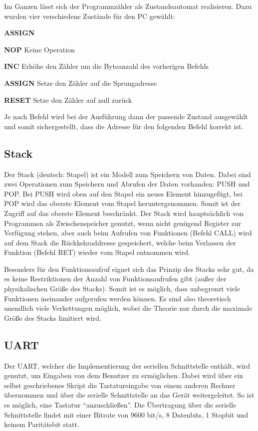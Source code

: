 Im Ganzen lässt sich der Programmzähler als Zustandsautomat realisieren. Dazu
wurden vier verschiedene Zustände für den \ac{PC} gewählt:

\begin{labeling}{\textbf{ASSIGN}}
\item[\textbf{NOP}]		Keine Operation
\item[\textbf{INC}]		Erhöhe den Zähler um die Byteanzahl des vorherigen Befehls
\item[\textbf{ASSIGN}]	Setze den Zähler auf die Sprungadresse
\item[\textbf{RESET}]	Setze den Zähler auf null zurück
\end{labeling}

Je nach Befehl wird bei der Ausführung dann der passende Zustand ausgewählt und
somit sichergestellt, dass die Adresse für den folgenden Befehl korrekt ist.
\subsection{Stack}
\label{s:stack}
Der Stack (deutsch: Stapel) ist ein Modell zum Speichern von Daten. Dabei sind
zwei Operationen zum Speichern und Abrufen der Daten vorhanden: PUSH und POP\@.
Bei PUSH wird oben auf den Stapel ein neues Element hinzugefügt, bei POP wird
das oberste Element vom Stapel heruntergenommen. Somit ist der Zugriff auf das
oberste Element beschränkt. Der Stack wird hauptsächlich von Programmen als
Zwischenspeicher genutzt, wenn nicht genügend Register zur Verfügung stehen,
aber auch beim Aufrufen von Funktionen (Befehl CALL) wird auf dem Stack die
Rückkehraddresse gespeichert, welche beim Verlassen der Funktion (Befehl RET)
wieder vom Stapel entnommen wird.

Besonders für den Funktionsaufruf eignet sich das Prinzip des Stacks sehr gut,
da es keine Restriktionen der Anzahl von Funktionsaufrufen gibt (außer der
physikalischen Größe des Stacks). Somit ist es möglich, dass unbegrenzt viele
Funktionen ineinander aufgerufen werden können. Es sind also theoretisch
unendlich viele Verkettungen möglich, wobei die Theorie nur durch die maximale
Größe des Stacks limitiert wird.

\subsection{UART}
\label{s:uart}
Der \ac{UART}, welcher die Implementierung der seriellen Schnittstelle enthält,
wird genutzt, um Eingaben von dem Benutzer zu ermöglichen. Dabei wird über ein
selbst geschriebenes Skript die Tastatureingabe von einem anderen Rechner
übernommen und über die serielle Schnittstelle an das Gerät weitergeleitet. So
ist es möglich, eine Tastatur "`anzuschließen"'. Die Übertragung über die serielle
Schnittstelle findet mit einer Bitrate von 9600 bit/s, 8 Datenbits, 1 Stopbit
und keinem Paritätsbit statt.

